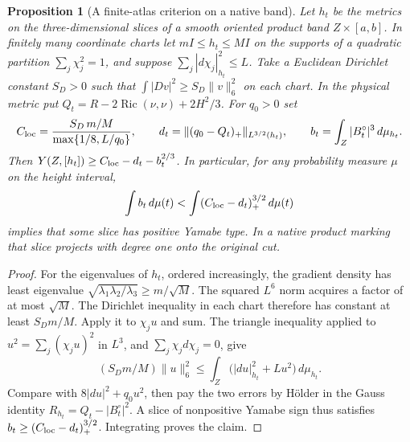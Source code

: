 \documentclass[11pt,letterpaper]{article}
\numberwithin{equation}{section}
\newtheorem{proposition}[theorem]{Proposition}
\theoremstyle{definition}
\DeclareMathOperator{\Ric}{Ric}
\begin{document}
\begin{proposition}[A finite-atlas criterion on a native band]\label{prop:atlas-band}
Let \(h_t\) be the metrics on the three-dimensional slices of a smooth
oriented product band \(Z\times[a,b]\). In finitely many coordinate
charts let \(mI\le h_t\le MI\) on the supports of a quadratic partition
\(\sum_j\chi_j^2=1\), and suppose
\(\sum_j |d\chi_j|_{h_t}^2\le L\). Take a Euclidean Dirichlet constant
\(S_D>0\) such that \(\int|Dv|^2\ge S_D\|v\|_6^2\) on each chart.
In the physical metric put \(Q_t=R-2\Ric(\nu,\nu)+2H^2/3\). For \(q_0>0\) set
\[
 C_{\rm loc}=\frac{S_D\,m/M}{\max\{1/8,L/q_0\}},\qquad
 d_t=\|(q_0-Q_t)_+\|_{L^{3/2}(h_t)},\qquad
 b_t=\int_Z|B_t^\circ|^3\,d\mu_{h_t}.
\]
Then \(Y(Z,[h_t])\ge C_{\rm loc}-d_t-b_t^{2/3}\).
In particular, for any probability measure \(\mu\) on the height interval,
\begin{equation}\label{eq:atlas-band}
 \int b_t\,d\mu(t) <
 \int (C_{\rm loc}-d_t)_+^{3/2}\,d\mu(t)
\end{equation}
implies that some slice has positive Yamabe type. In a native product
marking that slice projects with degree one onto the original cut.
\end{proposition}
\begin{proof}
For the eigenvalues of \(h_t\), ordered increasingly, the gradient density
has least eigenvalue \(\sqrt{\lambda_1\lambda_2/\lambda_3}\ge m/\sqrt M\).
The squared \(L^6\) norm acquires a factor of at most \(\sqrt M\).
The Dirichlet inequality in each chart therefore has constant at least
\(S_D m/M\). Apply it to \(\chi_j u\) and sum. The triangle inequality
applied to \(u^2=\sum_j(\chi_j u)^2\) in \(L^3\), and
\(\sum_j\chi_jd\chi_j=0\), give
\[
 (S_D m/M)\|u\|_6^2
 \le \int_Z \bigl(|du|_{h_t}^2+Lu^2\bigr)\,d\mu_{h_t}.
\]
Compare with \(8|du|^2+q_0u^2\), then pay the two errors by
H\"older in the Gauss identity \(R_{h_t}=Q_t-|B^\circ_t|^2\).
A slice of nonpositive Yamabe sign thus satisfies
\(b_t\ge (C_{\rm loc}-d_t)_+^{3/2}\). Integrating proves the claim.
\end{proof}
\end{document}
